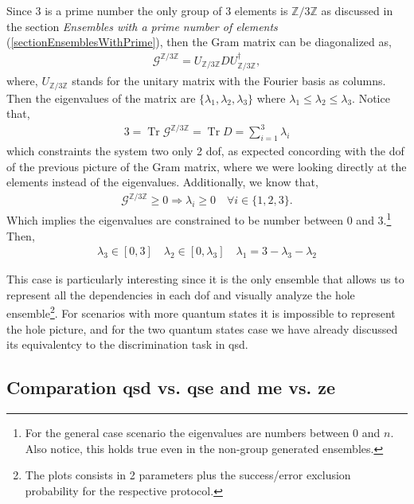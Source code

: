 \documentclass[12pt,letterpaper]{article}
\DeclareMathOperator{\tr}{Tr}
\begin{document}
\begin{multicols}{2}
Since 3 is a prime number the only group of 3 elements is $\mathbb{Z}/3\mathbb{Z}$ as discussed in the section \emph{Ensembles with a prime number of elements} (\ref{sectionEnsemblesWithPrime}), then the Gram matrix can be diagonalized as,
\begin{align*}
	\mathcal{G}^{\mathbb{Z}/3\mathbb{Z}}=U_{\mathbb{Z}/3\mathbb{Z}}DU^\dagger_{\mathbb{Z}/3\mathbb{Z}},
\end{align*}
where, $U_{\mathbb{Z}/3\mathbb{Z}}$ stands for the unitary matrix with the Fourier basis as columns. Then the eigenvalues of the matrix are $\{\lambda_1,\lambda_2,\lambda_3\}$ where $\lambda_1\leq\lambda_2\leq\lambda_3$. Notice that,
\begin{align*}
	3=\tr{\mathcal{G}^{\mathbb{Z}/3\mathbb{Z}}}=\tr{D}=\sum_{i=1}^3\lambda_i
\end{align*}
which constraints the system two only 2 \gls{dof}, as expected concording with the \gls{dof} of the previous picture of the Gram matrix, where we were looking directly at the elements instead of the eigenvalues. Additionally, we know that,
\begin{align*}
	\mathcal{G}^{\mathbb{Z}/3\mathbb{Z}}\geq 0\Rightarrow \lambda_i\geq 0 \quad\forall i\in\{1,2,3\}.
\end{align*}
Which implies the eigenvalues are constrained to be number between $0$ and $3$.\footnote{For the general case scenario the eigenvalues are numbers between 0 and $n$. Also notice, this holds true even in the non-group generated ensembles.} Then, 
\begin{align*}
	\lambda_3\in[0,3]\quad \lambda_2\in[0,\lambda_3]\quad \lambda_1=3-\lambda_3-\lambda_2
\end{align*}

This case is particularly interesting since it is the only ensemble that allows us to represent all the dependencies in each \gls{dof} and visually analyze the hole ensemble\footnote{The plots consists in 2 parameters plus the success/error exclusion probability for the respective protocol.}. For scenarios with more quantum states it is impossible to represent the hole picture, and for the two quantum states case we have already discussed its equivalentcy to the discrimination task in \gls{qsd}.

\subsection{Comparation \gls{qsd} vs. \gls{qse} and \gls{me} vs. \gls{ze}}


\end{multicols}
\end{document}
